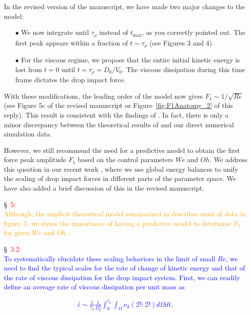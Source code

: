 \documentclass[]{article}
\newcommand*\blue{\textcolor{blue}}
\newcommand*\red{\textcolor{red}}
\newcommand{\VS}[1]{{\textcolor{orange}{#1}}}
\begin{document}
\begin{enumerate}
	In the revised version of the manuscript, we have made two major changes to the model:
	
	\begin{enumerate}
		\item[$\bullet$] We now integrate until $\tau_\rho$ instead of $t_{\text{max}}$, as you correctly pointed out. The first peak appears within a fraction of $t \sim \tau_\rho$ (see Figures 3 and 4).
		\item[$\bullet$] For the viscous regime, we propose that the entire initial kinetic energy is lost from $t = 0$ until $t = \tau_\rho = D_0/V_0$. The viscous dissipation during this time frame dictates the drop impact force.
	\end{enumerate}
	
	With these modifications, the leading order of the model now gives $F_1 \sim 1/\sqrt{Re}$ (see Figure 5c of the revised manuscript or Figure~\ref{fig:F1Anatomy_2} of this reply). This result is consistent with the findings of \citet{Gordillo2018}. In fact, there is only a minor discrepancy between the theoretical results of \citet{Gordillo2018, cheng2021drop} and our direct numerical simulation data.
	
	However, we still recommend the need for a predictive model to obtain the first force peak amplitude $F_1$ based on the control parameters $We$ and $Oh$. We address this question in our recent work \citep{sanjay2024PRL}, where we use global energy balances to unify the scaling of drop impact forces in different parts of the parameter space. We have also added a brief discussion of this in the revised manuscript.
	
	\S~\red{5:}\\
	\VS{Although, the implicit theoretical model summarized in \citet{cheng2021drop} describes most of data in figure~5, we stress the importance of having a predictive model to determine $F_1$ for given $We$ and $Oh$ \citep{sanjay2024PRL}.} 
	
	\S~\red{3.2:}\\
	\blue{To systematically elucidate these scaling behaviors in the limit of small $Re$, we need to find the typical scales for the rate of change of kinetic energy and that of the rate of viscous dissipation for the drop impact system. First, we can readily define an average rate of viscous dissipation per unit mass as}
	
	\blue{\begin{align}
			\bar{\varepsilon} \sim \frac{1}{\tau_\rho}\frac{1}{D_0^3}\int_0^{\tau_\rho}\int_\Omega\nu_d\left(\boldsymbol{\mathcal{D}:\mathcal{D}}\right)d\Omega dt,
	\end{align}}
	

\end{enumerate}
\end{document}
